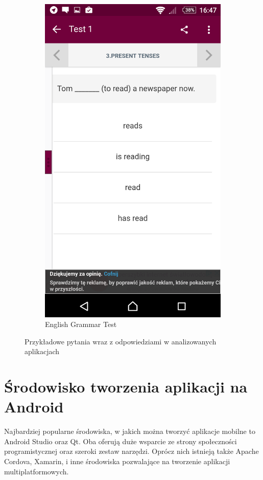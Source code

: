 \documentclass[archivemod, eng]{mgr}
\begin{document}
\begin{figure}[ht]
\begin{subfigure}{.32\textwidth}
				\includegraphics[width=.9\linewidth]{English_Grammar_Test.png}
				\caption{English Grammar Test}
				\label{fig:english_grammar_test}
			\end{subfigure}
			\caption{Przykładowe pytania wraz z odpowiedziami w analizowanych aplikacjach}
			\label{fig:przykladowe_aplikacje}
		\end{figure}
	
		\section{Środowisko tworzenia aplikacji na Android}
		Najbardziej popularne środowiska, w jakich można tworzyć aplikacje mobilne to Android Studio oraz Qt. Oba oferują duże wsparcie ze strony społeczności programistycznej oraz szeroki zestaw narzędzi. Oprócz nich istnieją także Apache Cordova, Xamarin, i inne środowiska pozwalające na tworzenie aplikacji multiplatformowych.
		
\end{document}
